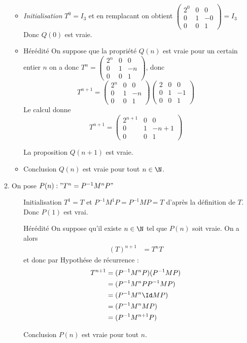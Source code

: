 \documentclass[a4paper, 11pt,reqno]{article}
\begin{document}
\begin{correction}
\begin{enumerate}
\begin{itemize}
\item \emph{Initialisation} $T^0=I_3$ et en remplacant on obtient 
$\left(\begin{array}{ccc}  
2^0&0&0 \\
0 &1&-0 \\
0&0&1 
\end{array}\right) =I_3$
Donc $Q(0)$ est vraie.

\item Hérédité On suppose que la propriété $Q(n) $ est vraie pour un certain entier $n$ on a donc $T^n =\left(\begin{array}{ccc}  
2^n&0&0 \\
0 &1&-n \\
0&0&1 
\end{array}\right)$, donc 
$$T^{n+1} = \left(\begin{array}{ccc}  
2^n&0&0 \\
0 &1&-n \\
0&0&1 
\end{array}\right) \left(\begin{array}{ccc}  
2&0&0 \\
0 &1&-1 \\
0&0&1 
\end{array}\right)$$
Le calcul donne 
$$T^{n+1} = \left(\begin{array}{ccc}  
2^{n+1}&0&0 \\
0 &1&-{n+1} \\
0&0&1 
\end{array}\right) $$

La proposition $Q(n+1)$ est vraie. 
\item Conclusion $Q(n) $ est vraie pour tout $n\in \N$. 

\end{itemize}

\item 




On pose $P(n) : "T^n =P^{-1} M^n P"$
\begin{itemize}
\item[Initialisation] 
$T^1 =T$ et $P^{-1} M^1 P= P^{-1} M P=T$ d'après la définition de $T$.
Donc $P(1) $ est vrai. 

\item[Hérédité] On suppose qu'il existe $n\in \N$ tel que $P(n)$ soit vraie. 
On a alors 
\begin{align*}
 (T)^{n+1}&=  T^n  T
\end{align*}
et donc par Hypothése de récurrence : 
\begin{align*}
 T^{n+1}&=  (P^{-1}M^n P )  (P^{-1}M P )\\
 							&=  (P^{-1}M^n P  P^{-1}M P )\\
 							&=  (P^{-1}M^n \Id M P )\\
 							&=  (P^{-1}M^n M P )\\
 							&=  (P^{-1}M^{n+1} P )
\end{align*}
\item[Conclusion] $P(n)$ est vraie pour tout $n$. 





\end{itemize}
\end{enumerate}
\end{correction}
\end{document}

